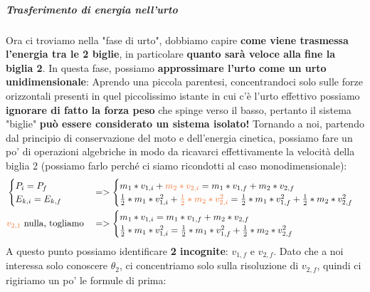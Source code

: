                 \subparagraph{Trasferimento di energia nell'urto}
                    Ora ci troviamo nella "fase di urto", dobbiamo capire \textbf{come viene trasmessa l'energia tra le 2 biglie}, in particolare \textbf{quanto sarà veloce alla fine la biglia 2}. In questa fase, possiamo \textbf{approssimare l'urto come un urto unidimensionale}:
                    Aprendo una piccola parentesi, concentrandoci solo sulle forze orizzontali presenti in quel piccolissimo istante in cui c'è l'urto effettivo possiamo \textbf{ignorare di fatto la forza peso} che spinge verso il basso, pertanto il sistema "biglie" \textbf{può essere considerato un sistema isolato!}
                    Tornando a noi, partendo dal principio di conservazione del moto e dell'energia cinetica, possiamo fare un po' di operazioni algebriche in modo da ricavarci effettivamente la velocità della biglia 2 (possiamo farlo perché ci siamo ricondotti al caso monodimensionale):
                    \begin{align*}
                        &\begin{cases}
                            P_i = P_f\\
                            E_{k, i} = E_{k, f}
                        \end{cases}&&=>
                        \begin{cases}
                            m_1*v_{1, i}+\textcolor{Orange}{m_2*v_{2, i}}=m_1*v_{1, f}+m_2*v_{2, f}\\
                            \frac{1}{2}*m_1*v^2_{1, i}+\textcolor{Orange}{\frac{1}{2}*m_2*v^2_{2, i}}=\frac{1}{2}*m_1*v^2_{1, f}+\frac{1}{2}*m_2*v^2_{2, f}
                        \end{cases}\\
                        &\textcolor{Orange}{v_{2, 1}\ } \textrm{nulla, togliamo}&&=>
                        \begin{cases}
                            m_1*v_{1, i}=m_1*v_{1, f}+m_2*v_{2, f}\\
                            \frac{1}{2}*m_1*v^2_{1, i}=\frac{1}{2}*m_1*v^2_{1, f}+\frac{1}{2}*m_2*v^2_{2, f}
                        \end{cases}
                    \end{align*}
                    A questo punto possiamo identificare \textbf{2 incognite}: $v_{1, f}$ e $v_{2, f}$. Dato che a noi interessa solo conoscere $\theta_2$, ci concentriamo solo sulla risoluzione di $v_{2, f}$, quindi ci rigiriamo un po' le formule di prima:
